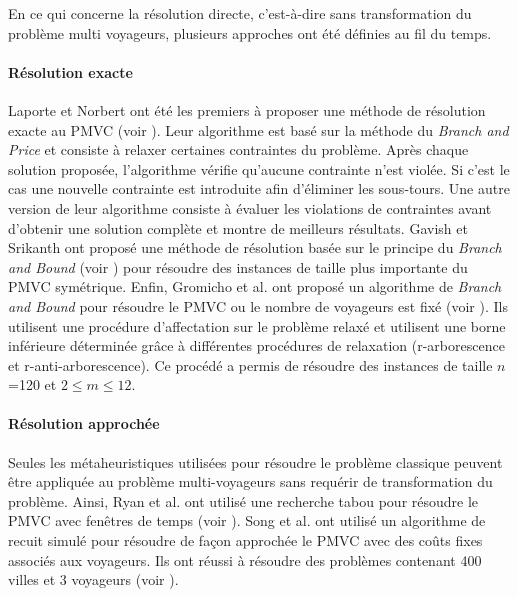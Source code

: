   En ce qui concerne la résolution directe, c'est-à-dire sans transformation du problème multi voyageurs, plusieurs approches ont été définies au fil du temps.
  
  \paragraph{Résolution exacte}\label{resolutionExacteMTSP}
  
  Laporte et Norbert ont été les premiers à proposer une méthode de résolution exacte au PMVC (voir \cite{Laporte1980}). Leur algorithme est basé sur la méthode du \textit{Branch and Price} et consiste à relaxer certaines contraintes du problème. Après chaque solution proposée, l'algorithme vérifie qu'aucune contrainte n'est violée. Si c'est le cas une nouvelle contrainte est introduite afin d'éliminer les sous-tours. Une autre version de leur algorithme consiste à évaluer les violations de contraintes avant d'obtenir une solution complète et montre de meilleurs résultats.
  Gavish et Srikanth ont proposé une méthode de résolution basée sur le principe du \textit{Branch and Bound} (voir \cite{Gavish1986}) pour résoudre des instances de taille plus importante du PMVC symétrique.
  Enfin, Gromicho et al. ont proposé un algorithme de \textit{Branch and Bound} pour résoudre le PMVC ou le nombre de voyageurs est fixé (voir \cite{Gromicho1992}). Ils utilisent une procédure d'affectation sur le problème relaxé et utilisent une borne inférieure déterminée grâce à différentes procédures de relaxation (r-arborescence et r-anti-arborescence). Ce procédé a permis de résoudre des instances de taille $n$=120 et $2\leq m\leq 12$.
  
  \paragraph{Résolution approchée}
  Seules les métaheuristiques utilisées pour résoudre le problème classique peuvent être appliquée au problème multi-voyageurs sans requérir de transformation du problème.
  Ainsi, Ryan et al. ont utilisé une recherche tabou pour résoudre le PMVC avec fenêtres de temps (voir \cite{Ryan1998}).
  Song et al. ont utilisé un algorithme de recuit simulé pour résoudre de façon approchée le PMVC avec des coûts fixes associés aux voyageurs. Ils ont réussi à résoudre des problèmes contenant 400 villes et 3 voyageurs (voir \cite{Song2003}).\\
  
